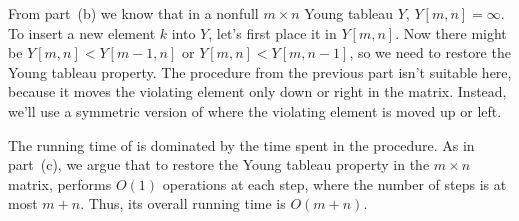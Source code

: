 From part~(b) we know that in a nonfull $m\times n$ Young tableau $Y$, $Y[m,n]=\infty$.
To insert a new element $k$ into $Y$, let's first place it in $Y[m,n]$.
Now there might be $Y[m,n]<Y[m-1,n]$ or $Y[m,n]<Y[m,n-1]$, so we need to restore the Young tableau property.
The  procedure from the previous part isn't suitable here, because it moves the violating element only down or right in the matrix.
Instead, we'll use a symmetric version of  where the violating element is moved up or left.


The running time of  is dominated by the time spent in the  procedure.
As in part~(c), we argue that to restore the Young tableau property in the $m\times n$ matrix,  performs $O(1)$ operations at each step, where the number of steps is at most $m+n$.
Thus, its overall running time is $O(m+n)$.
